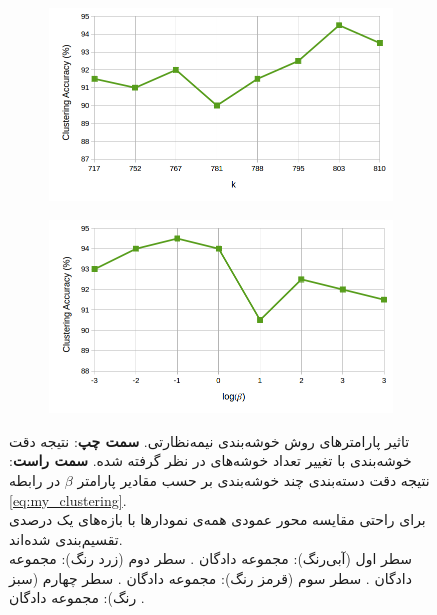 \begin{figure}[!h]
\begin{subfigure}[b]{0.43\linewidth}
  \end{subfigure}
    \begin{subfigure}[b]{0.43\linewidth}
    \includegraphics[width=\linewidth]{images/cluster_k_sun}
  \end{subfigure}
    \begin{subfigure}[b]{0.43\linewidth}
    \includegraphics[width=\linewidth]{images/cluster_beta_sun}
  \end{subfigure}
%

  \caption[تحلیل پارامترهای روش یادگیری نگاشت و خوشه‌بندی توام]{
  تاثیر پارامترهای  روش خوشه‌بندی نیمه‌نظارتی.
\textbf{سمت چپ}:
  نتیجه دقت خوشه‌بندی با تغییر تعداد خوشه‌های در نظر گرفته شده.
 \textbf{سمت راست}:
 نتیجه دقت  دسته‌بندی چند خوشه‌بندی بر حسب مقادیر پارامتر $\beta$ در رابطه \eqref{eq:my_clustering}.\\
 برای راحتی مقایسه محور عمودی  همه‌ی نمودارها با بازه‌های یک درصدی تقسیم‌بندی شده‌اند.\\
سطر اول (آبی‌رنگ): مجموعه دادگان . سطر دوم (زرد رنگ): مجموعه دادگان . سطر سوم (قرمز رنگ): مجموعه دادگان . سطر چهارم (سبز رنگ): مجموعه دادگان .
 }
  \label{fig:cluster_params}
  \end{figure}


